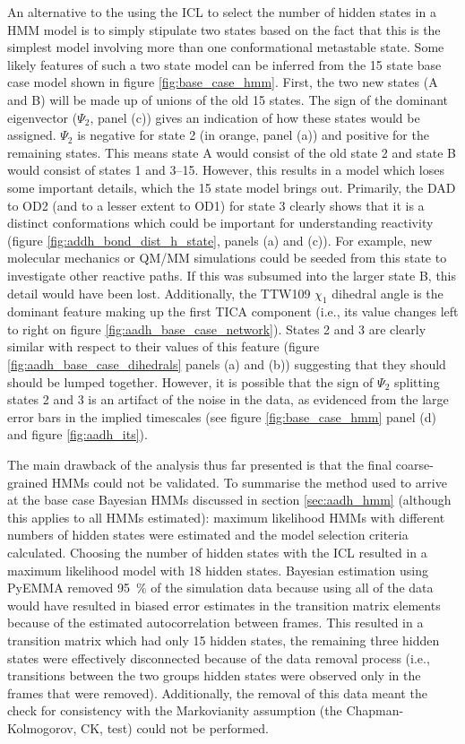 An alternative to the using the ICL to select the number of hidden states in a HMM model is to simply stipulate two states based on the fact  that this is the simplest model involving more than one conformational metastable state. Some  likely features of such a two state model can be inferred from the \num{15} state base case model shown in figure \ref{fig:base_case_hmm}. First, the two new states (A and B) will be made up of unions of the old \num{15} states.  The sign of the dominant eigenvector ($\Psi_{2}$, panel (c)) gives an indication of how these states would be assigned.  $\Psi_{2}$ is negative for state \num{2} (in orange, panel (a)) and positive for the remaining states. This means state A would consist of the old state \num{2} and state B would consist of states \num{1} and \numrange{3}{15}.  However, this results in a model which loses some important details, which the 15 state model brings out. Primarily, the DAD to OD2 (and to a lesser extent to OD1) for state \num{3} clearly shows that it is a distinct conformations which could be important for understanding reactivity (figure \ref{fig:addh_bond_dist_h_state}, panels (a) and (c)). For example, new molecular mechanics or QM/MM simulations could be seeded from this state to investigate other reactive paths.  If this was subsumed into the larger state B, this detail would have been lost. Additionally, the  TTW109 $\chi_{1}$  dihedral angle is the dominant feature making up the first TICA component (i.e., its value changes left to right on figure \ref{fig:aadh_base_case_network}).  States \num{2} and \num{3} are clearly similar with respect to their values of this feature (figure \ref{fig:aadh_base_case_dihedrals} panels (a) and (b)) suggesting that they should should be lumped together. However, it is possible that the sign of $\Psi_{2}$ splitting states \num{2} and \num{3} is an artifact of the noise in the data, as evidenced from the large error bars in the implied timescales (see figure \ref{fig:base_case_hmm} panel (d) and figure \ref{fig:aadh_its}). 


The main drawback of the analysis thus far presented is that the final coarse-grained HMMs could not be validated. To summarise the method used to arrive at the base case Bayesian HMMs discussed in section \ref{sec:aadh_hmm} (although this applies to all HMMs estimated): maximum likelihood HMMs with different numbers of hidden states were estimated and the model selection criteria calculated.  Choosing the number of hidden states with the ICL resulted in a maximum likelihood model with \num{18} hidden states. Bayesian estimation using PyEMMA removed \SI{95}{\percent} of the simulation data because using all of the data would have resulted in biased error estimates in the transition matrix elements because of the estimated autocorrelation between frames. This resulted in a transition matrix which had only \num{15} hidden states, the remaining three hidden states were effectively disconnected because of the data removal process (i.e., transitions between the two groups hidden states were observed only in the frames that were removed). Additionally, the removal of this data meant the check for consistency with the Markovianity assumption (the Chapman-Kolmogorov, CK, test) could not be performed. 

